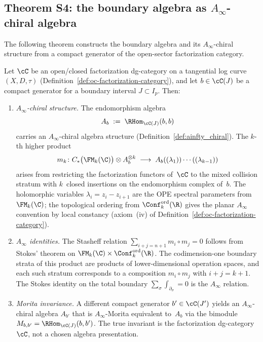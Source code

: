 \subsection{Theorem S4: the boundary algebra as
 $A_\infty$-chiral algebra}
\label{subsec:boundary-ainfty-chiral}

The following theorem constructs the boundary algebra and its
$A_\infty$-chiral structure from a compact generator of the
open-sector factorization category.

\begin{theorem}
\label{thm:boundary-ainfty-chiral}
Let $\cC$ be an open/closed factorization dg-category on a
tangential log curve $(X, D, \tau)$
\textup{(}Definition~\textup{\ref{def:oc-factorization-category}}\textup{)},
and let $b \in \cC(J)$ be a compact generator for a boundary
interval $J \subset I_p$. Then:
\begin{enumerate}[label=\textup{(\roman*)}]
\item \emph{$A_\infty$-chiral structure.}
 The endomorphism algebra
 \[
 A_b \;:=\; \RHom_{\cC(J)}(b, b)
 \]
 carries an $A_\infty$-chiral algebra structure
 \textup{(}Definition~\textup{\ref{def:ainfty_chiral}}\textup{)}.
 The $k$-th higher product
 \[
 m_k \colon
 C_\ast\bigl(\FM_k(\C)\bigr) \otimes A_b^{\otimes k}
 \;\longrightarrow\;
 A_b((\lambda_1))\cdots((\lambda_{k-1}))
 \]
 arises from restricting the factorization functors of~$\cC$
 to the mixed collision stratum with $k$~closed insertions on
 the endomorphism complex of~$b$.
 The holomorphic variables $\lambda_i = z_i - z_{i+1}$ are the
 OPE spectral parameters from $\FM_k(\C)$; the topological
 ordering from $\Conf_k^{\mathrm{ord}}(\R)$ gives the planar
 $A_\infty$ convention by local constancy
 \textup{(}axiom~\textup{(iv)} of
 Definition~\textup{\ref{def:oc-factorization-category}}\textup{)}.

\item \emph{$A_\infty$ identities.}
 The Stasheff relation
 $\sum_{i+j=n+1} m_i \circ m_j = 0$
 follows from Stokes' theorem on
 $\FM_k(\C) \times \Conf_k^{\mathrm{ord}}(\R)$.
 The codimension-one boundary strata of this product are
 products of lower-dimensional operation spaces, and each
 such stratum corresponds to a composition $m_i \circ m_j$
 with $i + j = k + 1$. The Stokes identity on the total
 boundary
 $\sum_\sigma \int_{\partial_\sigma} = 0$
 is the $A_\infty$ relation.

\item \emph{Morita invariance.}
 A different compact generator $b' \in \cC(J')$ yields an
 $A_\infty$-chiral algebra $A_{b'}$ that is $A_\infty$-Morita
 equivalent to~$A_b$ via the bimodule
 $M_{b,b'} = \RHom_{\cC(J)}(b, b')$.
 The true invariant is the factorization dg-category~$\cC$,
 not a chosen algebra presentation.
\end{enumerate}
\end{theorem}

